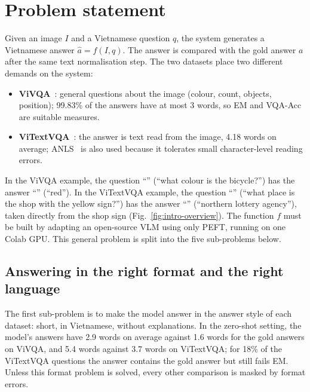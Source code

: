 \section{Problem statement}
\label{sec:intro-problem}

Given an image $I$ and a Vietnamese question $q$, the system generates a Vietnamese
answer $\hat{a} = f(I, q)$. The answer is compared with the gold answer $a$ after
the same text normalisation step. The two datasets place two different demands on
the system:

\begin{itemize}
  \item \textbf{ViVQA}~\cite{tran2021vivqa}: general questions about the image
  (colour, count, objects, position); 99.83\% of the answers have at most 3 words,
  so EM and VQA-Acc are suitable measures.
  \item \textbf{ViTextVQA}~\cite{nguyen2024vitextvqa}: the answer is text read from
  the image, 4.18 words on average; ANLS~\cite{biten2019stvqa} is also used because
  it tolerates small character-level reading errors.
\end{itemize}

In the ViVQA example, the question ``'' (``what colour is
the bicycle?'') has the answer ``'' (``red''). In the ViTextVQA example,
the question ``'' (``what place is the shop
with the yellow sign?'') has the answer ``'' (``northern
lottery agency''), taken directly from the shop sign
(Fig.~\ref{fig:intro-overview}). The function $f$ must be built by adapting an
open-source VLM using only PEFT, running on one Colab GPU. This general problem is
split into the five sub-problems below.

\subsection{Answering in the right format and the right language}

The first sub-problem is to make the model answer in the answer style of each
dataset: short, in Vietnamese, without explanations. In the zero-shot setting, the
model's answers have 2.9 words on average against 1.6 words for the gold answers on
ViVQA, and 5.4 words against 3.7 words on ViTextVQA; for 18\% of the ViTextVQA
questions the answer contains the gold answer but still fails EM. Unless this format
problem is solved, every other comparison is masked by format errors.

